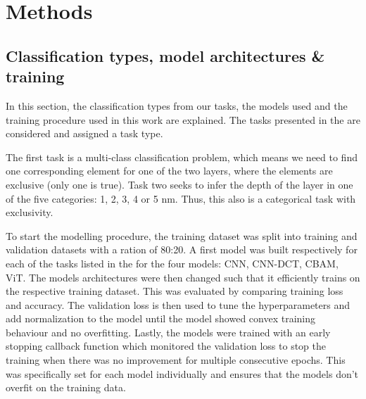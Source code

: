 
\chapter{Methods} %

\label{Chapter3} %







\section{Classification types, model architectures \& training}
In this section, the classification types from our tasks, the models used and the training procedure used in this work are explained.
The tasks presented in the  are considered and assigned a task type.

The first task is a multi-class classification problem, which means we need to find one corresponding element for one of the two layers, where the elements are exclusive (only one is true). Task two seeks to infer the depth of the layer in one of the five categories: 1, 2, 3, 4 or 5 nm. Thus, this also is a categorical task with exclusivity. 


To start the modelling procedure, the training dataset was split into training and validation datasets with a ration of 80:20. A first model was built respectively for each of the tasks listed in the  for the four models: CNN, CNN-DCT, CBAM, ViT. The models architectures were then changed such that it efficiently trains on the respective training dataset. This was evaluated by comparing training loss and accuracy.
The validation loss is then used to tune the hyperparameters and add normalization to the model until the model showed convex training behaviour and no overfitting. Lastly, the models were trained with an early stopping callback function which monitored the validation loss to stop the training when there was no improvement for multiple consecutive epochs. This was specifically set for each model individually and ensures that the models don't overfit on the training data.

